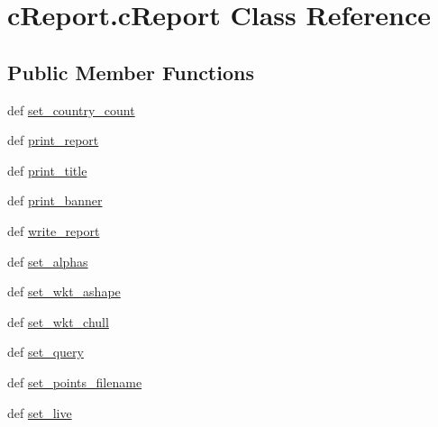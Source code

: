 \hypertarget{classcReport_1_1cReport}{\section{c\-Report.\-c\-Report \-Class \-Reference}
\label{classcReport_1_1cReport}
}
\subsection*{\-Public \-Member \-Functions}
\begin{DoxyCompactItemize}
\item 
def \hyperlink{classcReport_1_1cReport_a6c99e291e57740c632c41fcc9b8603a6}{set\-\_\-country\-\_\-count}
\item 
def \hyperlink{classcReport_1_1cReport_ae11a6d61ee12ec0b6504becca679a9bc}{print\-\_\-report}
\item 
def \hyperlink{classcReport_1_1cReport_a1795f52d62734b99b0ddc75f2cefe461}{print\-\_\-title}
\item 
def \hyperlink{classcReport_1_1cReport_a27c3f2cbe727afd25c8f8c121f998fa6}{print\-\_\-banner}
\item 
def \hyperlink{classcReport_1_1cReport_a2522ef0f563ba64badb9eaeae00ead23}{write\-\_\-report}
\item 
def \hyperlink{classcReport_1_1cReport_a6f447843cad3090b4b869451d1c59fe3}{set\-\_\-alphas}
\item 
def \hyperlink{classcReport_1_1cReport_ac42726e950b1d2fa9553a6a90b64424d}{set\-\_\-wkt\-\_\-ashape}
\item 
def \hyperlink{classcReport_1_1cReport_a7b5b91a2fc9871144143ab3eafad83f7}{set\-\_\-wkt\-\_\-chull}
\item 
def \hyperlink{classcReport_1_1cReport_a059d36ea2ab8094714e83d3c42e8dfbe}{set\-\_\-query}
\item 
def \hyperlink{classcReport_1_1cReport_aff719058b63601b2f087fe5c16f33117}{set\-\_\-points\-\_\-filename}
\item 
def \hyperlink{classcReport_1_1cReport_ab2156a47013f422f9eaa0e9192acadff}{set\-\_\-live}
\end{DoxyCompactItemize}
